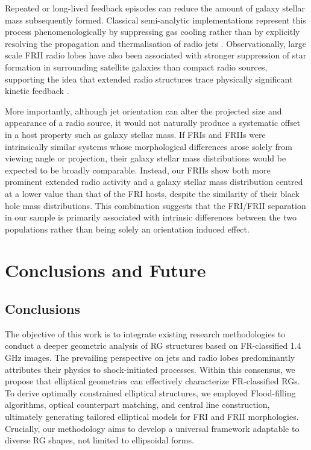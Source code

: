 \documentclass{aa}
\begin{document}
Repeated or long-lived feedback episodes can reduce the amount of galaxy stellar mass subsequently formed. Classical semi-analytic implementations represent this process phenomenologically by suppressing gas cooling rather than by explicitly resolving the propagation and thermalisation of radio jets \cite{Croton et al. 2006}. Observationally, large scale FRII radio lobes have also been associated with stronger suppression of star formation in surrounding satellite galaxies than compact radio sources, supporting the idea that extended radio structures trace physically significant kinetic feedback \cite{Wang et al. 2026}. 

More importantly, although jet orientation can alter the projected size and appearance of a radio source, it would not naturally produce a systematic offset in a host property such as galaxy stellar mass. If FRIs and FRIIs were intrinsically similar systems whose morphological differences arose solely from viewing angle or projection, their galaxy stellar mass distributions would be expected to be broadly comparable. Instead, our FRIIs show both more prominent extended radio activity and a galaxy stellar mass distribution centred at a lower value than that of the FRI hosts, despite the similarity of their black hole mass distributions. This combination suggests that the FRI/FRII separation in our sample is primarily associated with intrinsic differences between the two populations rather than being solely an orientation induced effect. 


\section{Conclusions and Future} \label{sec:Conclusions and Future}

\subsection{Conclusions}\label{sec:Conclusions}

The objective of this work is to integrate existing research methodologies to conduct a deeper geometric analysis of RG structures based on FR-classified 1.4 GHz images.
The prevailing perspective on jets and radio lobes predominantly attributes their physics to shock-initiated processes. Within this consensus, we propose that elliptical geometries can effectively characterize FR-classified RGs. To derive optimally constrained elliptical structures, we employed Flood-filling algorithms, optical counterpart matching, and central line construction, ultimately generating tailored elliptical models for FRI and FRII morphologies. Crucially, our methodology aims to develop a universal framework adaptable to diverse RG shapes, not limited to ellipsoidal forms. 
\end{document}
